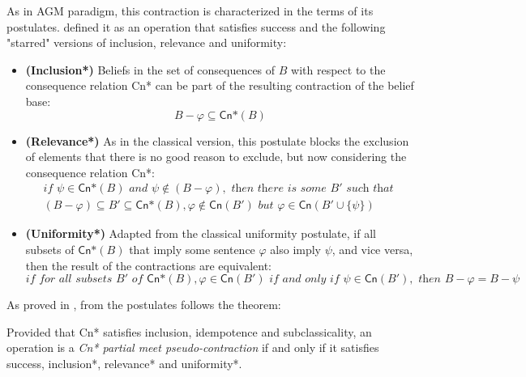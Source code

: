 As in AGM paradigm, this contraction is characterized in the terms of its postulates. \citeauthor{Santos2016} defined it as an operation that satisfies success and the following "starred" versions of inclusion, relevance and uniformity:

\begin{itemize}
    \item[] \textbf{(Inclusion*)} Beliefs in the set of consequences of $B$ with respect to the consequence relation \textsf{Cn*} can be part of the resulting contraction of the belief base:
    $$B - \varphi \subseteq \textsf{Cn*}(B)$$

    \item[] \textbf{(Relevance*)} As in the classical version, this postulate blocks the exclusion of elements that there is no good reason to exclude, but now considering the consequence relation \textsf{Cn*}:
    \begin{equation*}
        \begin{split}
            \textit{if } \psi \in \textsf{Cn*}(B) \textit{ and } \psi \notin  (B - \varphi), \textit{ then there is some } B' \textit{ such that }  \\
                (B - \varphi) \subseteq B' \subseteq \textsf{Cn*}(B), \varphi \notin \textsf{Cn}(B') \textit{ but } \varphi \in \textsf{Cn}(B' \cup \{ \psi \})
        \end{split}
    \end{equation*}

    \item[] \textbf{(Uniformity*)} Adapted from the classical uniformity postulate, if all subsets of $\textsf{Cn*}(B)$ that imply some sentence $\varphi$ also imply $\psi$, and vice versa, then the result of the contractions are equivalent:
    $$\textit{if for all subsets } B' \textit{ of } \textsf{Cn*}(B), \varphi \in \textsf{Cn}(B') \textit{ if and only if } \psi \in \textsf{Cn}(B'), \textit{ then } B - \varphi = B - \psi$$
\end{itemize}

As proved in \citet{Santos2016}, from the postulates follows the theorem:

\begin{theorem}
    Provided that \textsf{Cn*} satisfies inclusion, idempotence and subclassicality, an operation is a \textit{\textsf{Cn*} partial meet pseudo-contraction} if and only if it satisfies success, inclusion*, relevance* and uniformity*. 
\end{theorem}

